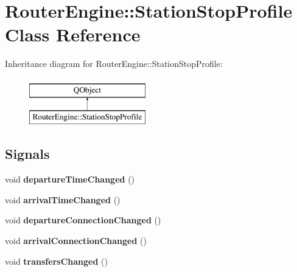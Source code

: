 \hypertarget{classRouterEngine_1_1StationStopProfile}{}\section{Router\+Engine\+:\+:Station\+Stop\+Profile Class Reference}
\label{classRouterEngine_1_1StationStopProfile}
Inheritance diagram for Router\+Engine\+:\+:Station\+Stop\+Profile\+:\begin{figure}[H]
\begin{center}
\leavevmode
\includegraphics[height=2.000000cm]{classRouterEngine_1_1StationStopProfile}
\end{center}
\end{figure}
\subsection*{Signals}
\begin{DoxyCompactItemize}
\item 
\mbox{\label{classRouterEngine_1_1StationStopProfile_ad33864259b9724e75d7f3187d233c5e5}} 
void {\bfseries departure\+Time\+Changed} ()
\item 
\mbox{\label{classRouterEngine_1_1StationStopProfile_a9e7f64d4bd79947ee31a83152da41832}} 
void {\bfseries arrival\+Time\+Changed} ()
\item 
\mbox{\label{classRouterEngine_1_1StationStopProfile_a84eeb659c20b5119c3020e8ed5d65b26}} 
void {\bfseries departure\+Connection\+Changed} ()
\item 
\mbox{\label{classRouterEngine_1_1StationStopProfile_a6d5895b452b8af08cfa65633db189dd3}} 
void {\bfseries arrival\+Connection\+Changed} ()
\item 
\mbox{\label{classRouterEngine_1_1StationStopProfile_ab102b2d4b7e4f8f9f987784006c6810c}} 
void {\bfseries transfers\+Changed} ()
\end{DoxyCompactItemize}
